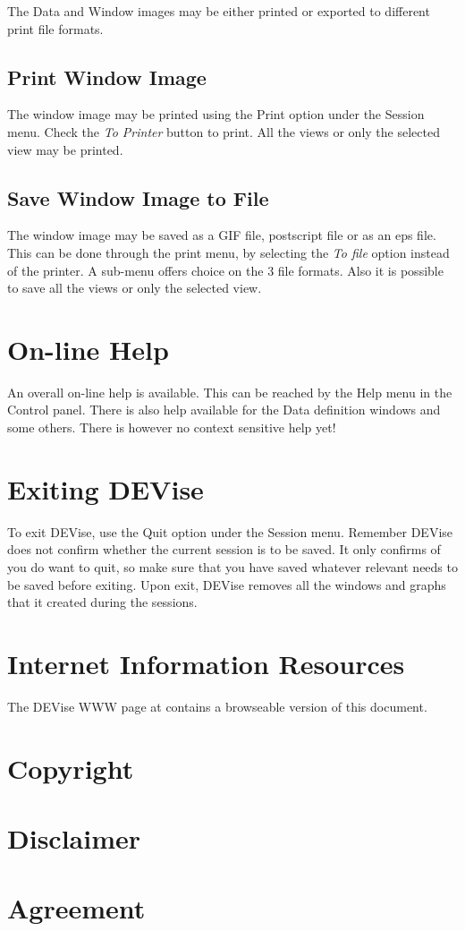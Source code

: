 The Data and Window images may be either printed or exported to
different print file formats.

\subsection{Print Window Image}

The window image may be printed using the Print option under the
Session menu. Check the {\em To Printer} button to print. All the
views or only the selected view may be printed.

\subsection{Save Window Image to File}

The window image may be saved as a GIF file, postscript file or as an
eps file. This can be done through the print menu, by selecting the
{\em To file} option instead of the printer. A sub-menu offers choice
on the 3 file formats. Also it is possible to save all the views or
only the selected view.

\section{On-line Help}

An overall on-line help is available. This can be reached by the Help
menu in the Control panel. There is also help available for the Data
definition windows and some others. There is however no context
sensitive help yet!

\section{Exiting DEVise}

To exit DEVise, use the Quit option under the Session menu. Remember
DEVise does not confirm whether the current session is to be saved. It
only confirms of you do want to quit, so make sure that you have saved
whatever relevant needs to be saved before exiting. Upon exit, DEVise
removes all the windows and graphs that it created during the
sessions.

\section{Internet Information Resources}

The DEVise WWW page at
 contains a
browseable version of this document.

\newpage 
\section*{Copyright}



\section*{Disclaimer}



\newpage
\section*{Agreement}




